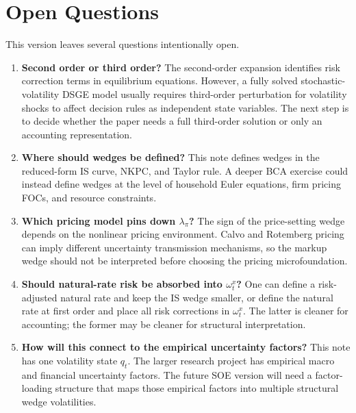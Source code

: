 \section{Open Questions}

This version leaves several questions intentionally open.

\begin{enumerate}[label=\textbf{Q\arabic*.}]
    \item \textbf{Second order or third order?}
    The second-order expansion identifies risk correction terms in equilibrium
    equations. However, a fully solved stochastic-volatility DSGE model usually
    requires third-order perturbation for volatility shocks to affect decision
    rules as independent state variables. The next step is to decide whether the
    paper needs a full third-order solution or only an accounting
    representation.

    \item \textbf{Where should wedges be defined?}
    This note defines wedges in the reduced-form IS curve, NKPC, and Taylor
    rule. A deeper BCA exercise could instead define wedges at the level of
    household Euler equations, firm pricing FOCs, and resource constraints.

    \item \textbf{Which pricing model pins down \(\lambda_\pi\)?}
    The sign of the price-setting wedge depends on the nonlinear pricing
    environment. Calvo and Rotemberg pricing can imply different uncertainty
    transmission mechanisms, so the markup wedge should not be interpreted
    before choosing the pricing microfoundation.

    \item \textbf{Should natural-rate risk be absorbed into \(\omega^x_t\)?}
    One can define a risk-adjusted natural rate and keep the IS wedge smaller,
    or define the natural rate at first order and place all risk corrections in
    \(\omega^x_t\). The latter is cleaner for accounting; the former may be
    cleaner for structural interpretation.

    \item \textbf{How will this connect to the empirical uncertainty factors?}
    This note has one volatility state \(q_t\). The larger research project has
    empirical macro and financial uncertainty factors. The future SOE version
    will need a factor-loading structure that maps those empirical factors into
    multiple structural wedge volatilities.
\end{enumerate}
